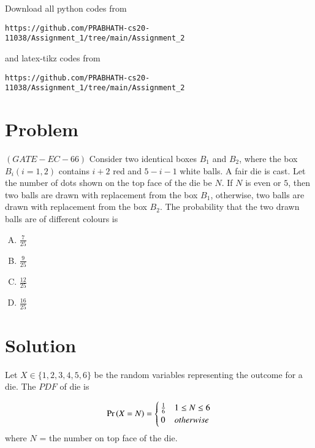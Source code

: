 \documentclass[journal,12pt,twocolumn]{IEEEtran}
\begin{document}
Download all python codes from 
\begin{lstlisting}
https://github.com/PRABHATH-cs20-11038/Assignment_1/tree/main/Assignment_2
\end{lstlisting}

and latex-tikz codes from
\begin{lstlisting}
https://github.com/PRABHATH-cs20-11038/Assignment_1/tree/main/Assignment_2
\end{lstlisting}

\section{Problem}

$(GATE-EC-66)$ Consider two identical boxes $B_1$ and $B_2$, where the box $B_i(i = 1, 2)$ contains $i + 2$ red and $5−i−1$ white balls. A fair die is cast. Let the number of dots shown on the top face of the die be $N$. If $N$ is even or $5$, then two balls are drawn with replacement from the box $B_1$, otherwise, two balls are drawn with replacement from the box $B_2$. The probability that the two drawn balls are of different colours is

\begin{enumerate}[(A)]
    \item $\frac{7}{25}$ \\
    
    \item $\frac{9}{25}$ \\
    
    \item $\frac{12}{25}$ \\
    
    \item $\frac{16}{25}$
\end{enumerate}

\section{Solution}

Let $X \in \{1,2,3,4,5,6\}$ be the random variables representing the outcome for a die. The $PDF$ of die is

\begin{align}
    \Pr\left(X=N\right) =
    \begin{cases}
    \frac{1}{6} & 1 \leq N \leq 6\\
    0 & otherwise
    \end{cases}
\end{align}
where $N$ = the number on top face of the die.
\end{document}
